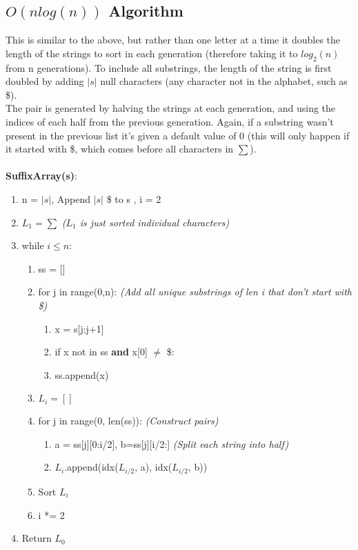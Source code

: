 \subsection{$O(nlog(n))$ Algorithm}
This is similar to the above, but rather than one letter at a time it doubles the length of the strings to sort in each generation (therefore taking it to $log_2(n)$ from n generations). To include all substrings, the length of the string is first doubled by adding $|s|$ null characters (any character not in the alphabet, such as \$). \\
The pair is generated by halving the strings at each generation, and using the indices of each half from the previous generation. Again, if a substring wasn't present in the previous list it's given a default value of 0 (this will only happen if it started with \$, which comes before all characters in $\sum$). \\ \\
\textbf{SuffixArray(s)}:
\begin{enumerate}[label=\Alph*]
    \item n = $|s|$, Append $|s|$ \$ to s , i = 2
    \item $L_1 = \sum$ \emph{($L_1$ is just sorted individual characters)}
    \item while $i\leq n$:
\begin{enumerate}[label=\arabic*]
    \item ss = []
    \item for j in range(0,n): \emph{(Add all unique substrings of len i that don't start with \$)}
    \begin{enumerate}
        \item x = s[j:j+1] 
        \item if x not in ss \textbf{and} x[0] $\neq$ \$:
        \item [] \quad ss.append(x)
    \end{enumerate}     
    \item $L_i = []$
    \item for j in range(0, len(ss)): \emph{(Construct pairs)}
    \begin{enumerate}
        \item a = ss[j][0:i/2], b=ss[j][i/2:] \emph{(Split each string into half)}
        \item $L_i$.append(idx($L_{i/2}$, a), idx($L_{i/2}$, b))
    \end{enumerate} 
    \item Sort $L_i$ 
    \item i *= 2
\end{enumerate}    
    \item Return $L_0$
\end{enumerate}

